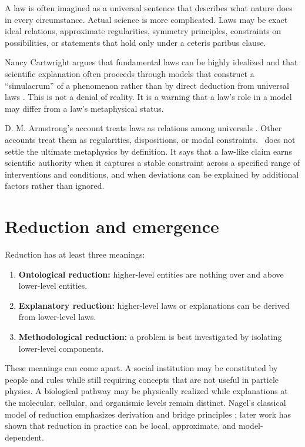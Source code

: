A law is often imagined as a universal sentence that describes what nature does
in every circumstance. Actual science is more complicated. Laws may be exact
ideal relations, approximate regularities, symmetry principles, constraints on
possibilities, or statements that hold only under a ceteris paribus clause.

Nancy Cartwright argues that fundamental laws can be highly idealized and that
scientific explanation often proceeds through models that construct a
\enquote{simulacrum} of a phenomenon rather than by direct deduction from
universal laws \citep{cartwright1983,cartwright1999}. This is not a denial of
reality. It is a warning that a law's role in a model may differ from a law's
metaphysical status.

D. M. Armstrong's account treats laws as relations among universals
\citep{armstrong1983}. Other accounts treat them as regularities, dispositions,
or modal constraints. \RCR\ does not settle the ultimate metaphysics by
definition. It says that a law-like claim earns scientific authority when it
captures a stable constraint across a specified range of interventions and
conditions, and when deviations can be explained by additional factors rather
than ignored.

\section{Reduction and emergence}

Reduction has at least three meanings:

\begin{enumerate}
\item \textbf{Ontological reduction:} higher-level entities are nothing over
and above lower-level entities.
\item \textbf{Explanatory reduction:} higher-level laws or explanations can be
derived from lower-level laws.
\item \textbf{Methodological reduction:} a problem is best investigated by
isolating lower-level components.
\end{enumerate}

These meanings can come apart. A social institution may be constituted by
people and rules while still requiring concepts that are not useful in particle
physics. A biological pathway may be physically realized while explanations at
the molecular, cellular, and organismic levels remain distinct. Nagel's
classical model of reduction emphasizes derivation and bridge principles
\citep{nagel1961}; later work has shown that reduction in practice can be
local, approximate, and model-dependent.

